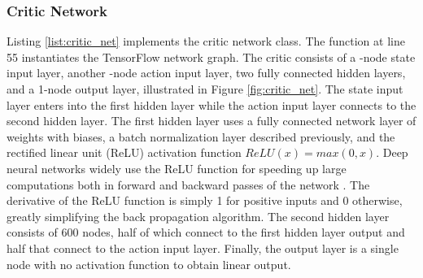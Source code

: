 \subsubsection{Critic Network}
Listing \ref{list:critic_net} implements the critic network class. The function \mbox{} at line 55 instantiates the TensorFlow network graph. The critic consists of a -node state input layer, another -node action input layer, two fully connected hidden layers, and a 1-node output layer, illustrated in Figure \ref{fig:critic_net}. The state input layer enters into the first hidden layer while the action input layer connects to the second hidden layer. The first hidden layer uses a fully connected network layer of weights with biases, a batch normalization layer described previously, and the rectified linear unit (ReLU) activation function $ReLU(x) = max(0,x)$. Deep neural networks widely use the ReLU function for speeding up large computations both in forward and backward passes of the network \cite{2017arXiv171005941R}. The derivative of the ReLU function is simply 1 for positive inputs and 0 otherwise, greatly simplifying the back propagation algorithm. The second hidden layer consists of 600 nodes, half of which connect to the first hidden layer output and half that connect to the action input layer. Finally, the output layer is a single node with no activation function to obtain linear output.

